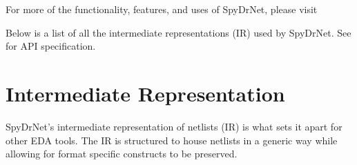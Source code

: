 \documentclass[letterpaper,10pt,english,openany,oneside]{sphinxmanual}
\begin{document}
For more of the functionality, features, and uses of SpyDrNet, please visit 

Below is a list of all the intermediate representations (IR) used by SpyDrNet. See {\hyperref[\detokenize{reference/classes/index:api-summary}]{}} for API specification.


\section{Intermediate Representation}
\label{\detokenize{tutorial:intermediate-representation}}
SpyDrNet’s intermediate representation of netlists (IR) is what sets it apart for other EDA tools. The IR is structured to house netlists in a generic way while allowing for format specific constructs to be preserved.
\end{document}
